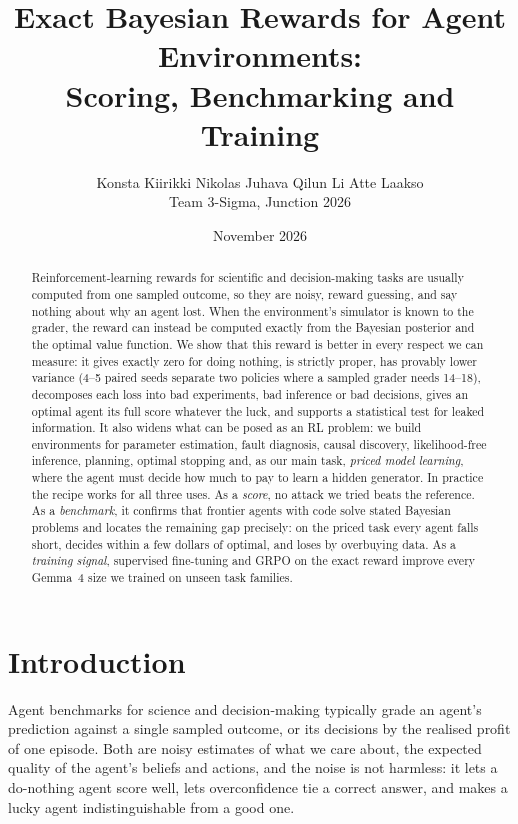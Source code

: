 \documentclass[10pt]{article}
\title{Exact Bayesian Rewards for Agent Environments:\\
Scoring, Benchmarking and Training}
\author{%
  \begin{tabular}{c}
    Konsta Kiirikki \qquad Nikolas Juhava \qquad Qilun Li \qquad Atte Laakso\\[2pt]
    Team 3-Sigma, Junction 2026
  \end{tabular}}
\date{November 2026}
\theoremstyle{definition}
\theoremstyle{remark}
\theoremstyle{plain}
\begin{document}
\maketitle

\begin{abstract}
Reinforcement-learning rewards for scientific and decision-making tasks are usually computed
from one sampled outcome, so they are noisy, reward guessing, and say nothing about why an
agent lost. When the environment's simulator is known to the grader, the reward can instead be
computed exactly from the Bayesian posterior and the optimal value function. We show that this
reward is better in every respect we can measure: it gives exactly zero for doing nothing, is
strictly proper, has provably lower variance (4--5 paired seeds separate two policies where a
sampled grader needs 14--18), decomposes each loss into bad experiments, bad inference or bad
decisions, gives an optimal agent its full score whatever the luck, and supports a statistical
test for leaked information. It also widens what can be posed as an RL problem: we build
environments for parameter estimation, fault diagnosis, causal discovery, likelihood-free
inference, planning, optimal stopping and, as our main task, \emph{priced model learning}, where
the agent must decide how much to pay to learn a hidden generator. In practice the recipe works
for all three uses. As a \emph{score}, no attack we tried beats the reference. As a
\emph{benchmark}, it confirms that frontier agents with code solve stated Bayesian problems and
locates the remaining gap precisely: on the priced task every agent falls short, decides within a
few dollars of optimal, and loses by overbuying data. As a \emph{training signal}, supervised
fine-tuning and GRPO on the exact reward improve every Gemma~4 size we trained on unseen task
families.
\end{abstract}

\section{Introduction}

Agent benchmarks for science and decision-making typically grade an agent's prediction against
a single sampled outcome, or its decisions by the realised profit of one episode. Both are noisy
estimates of what we care about, the expected quality of the agent's beliefs and actions, and the
noise is not harmless: it lets a do-nothing agent score well, lets overconfidence tie a correct
answer, and makes a lucky agent indistinguishable from a good one.
\end{document}
